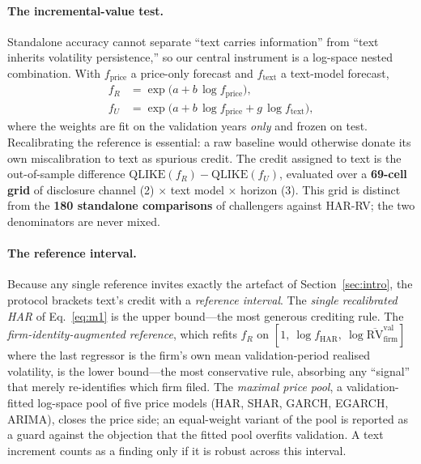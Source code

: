 \paragraph{The incremental-value test.}
Standalone accuracy cannot separate ``text carries information'' from ``text inherits volatility persistence,'' so our central instrument is a log-space nested combination. With $f_{\text{price}}$ a price-only forecast and $f_{\text{text}}$ a text-model forecast,
\begin{align}
f_R &= \exp\!\bigl(a + b\,\log f_{\text{price}}\bigr),\nonumber\\
f_U &= \exp\!\bigl(a + b\,\log f_{\text{price}} + g\,\log f_{\text{text}}\bigr),
\label{eq:m1}
\end{align}
where the weights are fit on the validation years \emph{only} and frozen on test. Recalibrating the reference is essential: a raw baseline would otherwise donate its own miscalibration to text as spurious credit. The credit assigned to text is the out-of-sample difference $\mathrm{QLIKE}(f_R)-\mathrm{QLIKE}(f_U)$, evaluated over a \textbf{69-cell grid} of disclosure channel (2) $\times$ text model $\times$ horizon (3). This grid is distinct from the \textbf{180 standalone comparisons} of challengers against HAR-RV; the two denominators are never mixed.

\paragraph{The reference interval.}
Because any single reference invites exactly the artefact of Section~\ref{sec:intro}, the protocol brackets text's credit with a \emph{reference interval}. The \emph{single recalibrated HAR} of Eq.~\eqref{eq:m1} is the upper bound---the most generous crediting rule. The \emph{firm-identity-augmented reference}, which refits $f_R$ on $[1,\ \log f_{\text{HAR}},\ \log \overline{\mathrm{RV}}^{\text{val}}_{\text{firm}}]$ where the last regressor is the firm's own mean validation-period realised volatility, is the lower bound---the most conservative rule, absorbing any ``signal'' that merely re-identifies which firm filed. The \emph{maximal price pool}, a validation-fitted log-space pool of five price models (HAR, SHAR, GARCH, EGARCH, ARIMA), closes the price side; an equal-weight variant of the pool is reported as a guard against the objection that the fitted pool overfits validation. A text increment counts as a finding only if it is robust across this interval.

